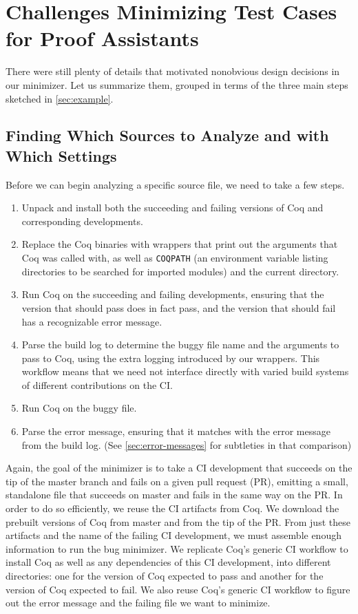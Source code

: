 \documentclass[a4paper,USenglish,cleveref,autoref,thm-restate]{lipics-v2021}
\begin{document}
\section{Challenges Minimizing Test Cases for Proof Assistants}\label{sec:harder}

There were still plenty of details that motivated nonobvious design decisions in our minimizer.
Let us summarize them, grouped in terms of the three main steps sketched in \autoref{sec:example}.

\subsection{Finding Which Sources to Analyze and with Which Settings}

Before we can begin analyzing a specific source file, we need to take a few steps.
\begin{enumerate}
\item Unpack and install both the succeeding and failing versions of Coq and corresponding developments.
\item Replace the Coq binaries with wrappers that print out the arguments that Coq was called with, as well as \texttt{COQPATH} (an environment variable listing directories to be searched for imported modules) and the current directory.
\item Run Coq on the succeeding and failing developments, ensuring that the version that should pass does in fact pass, and the version that should fail has a recognizable error message.
\item Parse the build log to determine the buggy file name and the arguments to pass to Coq, using the extra logging introduced by our wrappers.
  This workflow means that we need not interface directly with varied build systems of different contributions on the CI.
\item Run Coq on the buggy file.
\item Parse the error message, ensuring that it matches with the error message from the build log.
  (See \autoref{sec:error-messages} for subtleties in that comparison)
\end{enumerate}

Again, the goal of the minimizer is to take a CI development that succeeds on the tip of the master branch and fails on a given pull request (PR), emitting a small, standalone file that succeeds on master and fails in the same way on the PR.
In order to do so efficiently, we reuse the CI artifacts from Coq.
We download the prebuilt versions of Coq from master and from the tip of the PR.
From just these artifacts and the name of the failing CI development, we must assemble enough information to run the bug minimizer.
We replicate Coq's generic CI workflow to install Coq as well as any dependencies of this CI development, into different directories: one for the version of Coq expected to pass and another for the version of Coq expected to fail.
We also reuse Coq's generic CI workflow to figure out the error message and the failing file we want to minimize.
\end{document}
